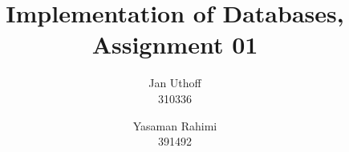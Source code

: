 \documentclass{exercisesheet}
\title{Implementation of Databases, Assignment 01}
\author{
    Jan Uthoff  \\ 310336
    \and
    Yasaman Rahimi \\ 391492
}
\begin{document}
\maketitle

\pointtable


\end{document}
